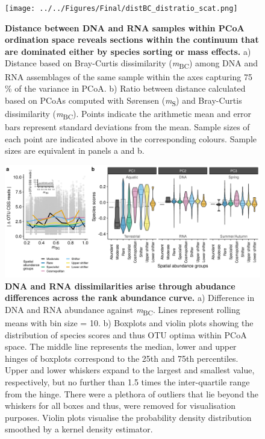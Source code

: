 \documentclass[12pt,a4paper]{article} %
\begin{document}
\begin{figure}[!ht]
\centering
\texttt{[image: ../../Figures/Final/distBC\_distratio\_scat.png]}
\caption{\textbf{Distance between DNA and RNA samples within PCoA ordination space reveals sections within the continuum that are dominated either by species sorting or mass effects.} a) Distance based on Bray-Curtis dissimilarity (\textit{m}\textsubscript{BC}) among DNA and RNA assemblages of the same sample within the axes capturing 75 \% of the variance in PCoA. b) Ratio between distance calculated based on PCoAs computed with S{\o}rensen (\textit{m}\textsubscript{S}) and Bray-Curtis dissimilarity (\textit{m}\textsubscript{BC}). Points indicate the arithmetic mean and error bars represent standard deviations from the mean. Sample sizes of each point are indicated above in the corresponding colours. Sample sizes are equivalent in panels a and b.}
\end{figure}

\begin{figure}[!ht]
\centering
\includegraphics[width=15cm]{../../Figures/Final/abgroups_rollmean_violin}
\caption{\textbf{DNA and RNA dissimilarities arise through abudance differences across the rank abundance curve.} a) Difference in DNA and RNA abundance against \textit{m}\textsubscript{BC}. Lines represent rolling means with bin size = 10. b) Boxplots and violin plots showing the distribution of species scores and thus OTU optima within PCoA space. The middle line represents the median, lower and upper hinges of boxplots correspond to the 25th and 75th percentiles. Upper and lower whiskers expand to the largest and smallest value, respectively, but no further than 1.5 times the inter-quartile range from the hinge. There were a plethora of outliers that lie beyond the whiskers for all boxes and thus, were removed for visualisation purposes. Violin plots visualise the probability density distribution smoothed by a kernel density estimator.}
\end{figure}
\end{document}
